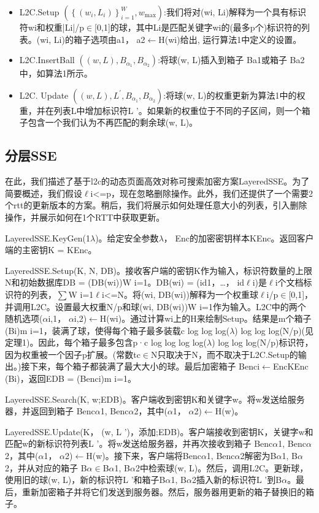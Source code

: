 \documentclass[UTF8]{article}
\begin{document}
\begin{itemize}
  \item L2C.Setup $\left(\left\{\left(w_i, L_i\right)\right\}_{i=1}^W, w_{\max }\right)$:我们将对(wi, Li)解释为一个具有标识符wi和权重|Li|/p$\in$[0,1]的球，其中Li是匹配关键字wi的(最多p个)标识符的列表。(wi, Li)的箱子选项由a1， a2$\leftarrow$H(wi)给出, 运行算法1中定义的设置。
  \item L2C.InsertBall $\left((w, L), B_{\alpha_1}, B_{\alpha_2}\right)$:将球(w, L)插入到箱子 Ba1或箱子 Ba2中，如算法1所示。
  \item L2C. Update $\left((w, L), L^{\prime}, B_{\alpha_1}, B_{\alpha_2}\right)$:将球(w, L)的权重更新为算法1中的权重，并在列表L中增加标识符L '。如果新的权重位于不同的子区间，则一个箱子包含一个我们认为不再匹配的剩余球(w, L)。
\end{itemize}

\subsection{分层SSE}
在此，我们描述了基于l2c的动态页面高效对称可搜索加密方案LayeredSSE。为了简要概述，我们假设$\ell$i<=p，现在忽略删除操作。此外，我们还提供了一个需要2个rtt的更新版本的方案。稍后，我们将展示如何处理任意大小的列表，引入删除操作，并展示如何在1个RTT中获取更新。

LayeredSSE.KeyGen(1$\lambda$)。给定安全参数$\lambda$， Enc的加密密钥样本KEnc。返回客户端的主密钥K = KEnc。

LayeredSSE.Setup(K, N, DB)。接收客户端的密钥K作为输入，标识符数量的上限N和初始数据库DB = (DB(wi))W i=1。DB(wi) = (id1，…， id$\ell$i)是$\ell$i个文档标识符的列表，$\sum$W i=1$\ell$i<=N。将(wi, DB(wi))解释为一个权重球$\ell$i/p$\in$[0,1]，并调用L2C。设置最大权重N/p和球(wi, DB(wi))W i=1作为输入。L2C中的两个随机选项($\alpha$i,1， $\alpha$i,2)$\leftarrow$H(wi)。通过计算wi上的H来绘制Setup。结果是m个箱子(Bi)m i=1，装满了球，使得每个箱子最多装载c log log log($\lambda$) log log log(N/p)(见定理1)。因此，每个箱子最多包含p·c log log log log($\lambda$) log log log(N/p)标识符，因为权重被一个因子p扩展。(常数tc$\in$N只取决于N，而不取决于L2C.Setup的输出。)接下来，每个箱子都装满了最大大小的球。最后加密箱子 Benci$\leftarrow$EncKEnc (Bi)，返回EDB = (Benci)m i=1。

LayeredSSE.Search(K, w;EDB)。客户端收到密钥K和关键字w。将w发送给服务器，并返回到箱子 Benc$\alpha$1, Benc$\alpha$2，其中($\alpha$1， $\alpha$2)$\leftarrow$H(w)。

LayeredSSE.Update(K， (w, L ')，添加;EDB)。客户端接收到密钥K，关键字w和匹配w的新标识符列表L '。将w发送给服务器，并再次接收到箱子 Benc$\alpha$1, Benc$\alpha$2，其中($\alpha$1， $\alpha$2)$\leftarrow$H(w)。接下来，客户端将Benc$\alpha$1, Benc$\alpha$2解密为B$\alpha$1, B$\alpha$2，并从对应的箱子 B$\alpha$$\in${B$\alpha$1, B$\alpha$2}中检索球(w, L)。然后，调用L2C。更新球，使用旧的球(w, L)，新的标识符L '和箱子B$\alpha$1, B$\alpha$2插入新的标识符L '到B$\alpha$。最后，重新加密箱子并将它们发送到服务器。然后，服务器用更新的箱子替换旧的箱子。
\end{document}
